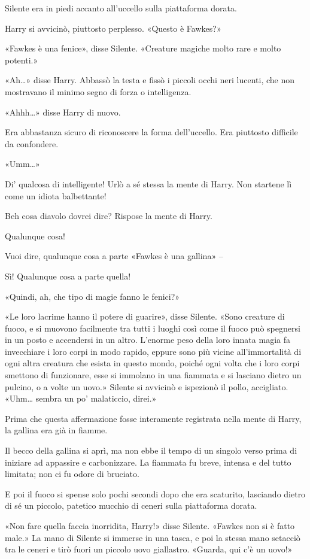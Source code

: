 Silente era in piedi accanto all’uccello sulla piattaforma dorata.

Harry si avvicinò, piuttosto perplesso. «Questo è Fawkes?»

«Fawkes è una fenice», disse Silente. «Creature magiche molto rare e molto potenti.»

«Ah…» disse Harry. Abbassò la testa e fissò i piccoli occhi neri lucenti, che non mostravano il minimo segno di forza o intelligenza.

«Ahhh…» disse Harry di nuovo.

Era abbastanza sicuro di riconoscere la forma dell’uccello. Era piuttosto difficile da confondere.

«Umm…»

Di’ qualcosa di intelligente! Urlò a sé stessa la mente di Harry. Non startene lì come un idiota balbettante!

Beh cosa diavolo dovrei dire? Rispose la mente di Harry.

Qualunque cosa!

Vuoi dire, qualunque cosa a parte «Fawkes è una gallina» –

Sì! Qualunque cosa a parte quella!

«Quindi, ah, che tipo di magie fanno le fenici?»

«Le loro lacrime hanno il potere di guarire», disse Silente. «Sono creature di fuoco, e si muovono facilmente tra tutti i luoghi così come il fuoco può spegnersi in un posto e accendersi in un altro. L’enorme peso della loro innata magia fa invecchiare i loro corpi in modo rapido, eppure sono più vicine all’immortalità di ogni altra creatura che esista in questo mondo, poiché ogni volta che i loro corpi smettono di funzionare, esse si immolano in una fiammata e si lasciano dietro un pulcino, o a volte un uovo.» Silente si avvicinò e ispezionò il pollo, accigliato. «Uhm… sembra un po’ malaticcio, direi.»

Prima che questa affermazione fosse interamente registrata nella mente di Harry, la gallina era già in fiamme.

Il becco della gallina si aprì, ma non ebbe il tempo di un singolo verso prima di iniziare ad appassire e carbonizzare. La fiammata fu breve, intensa e del tutto limitata; non ci fu odore di bruciato.

E poi il fuoco si spense solo pochi secondi dopo che era scaturito, lasciando dietro di sé un piccolo, patetico mucchio di ceneri sulla piattaforma dorata.

«Non fare quella faccia inorridita, Harry!» disse Silente. «Fawkes non si è fatto male.» La mano di Silente si immerse in una tasca, e poi la stessa mano setacciò tra le ceneri e tirò fuori un piccolo uovo giallastro. «Guarda, qui c’è un uovo!»

